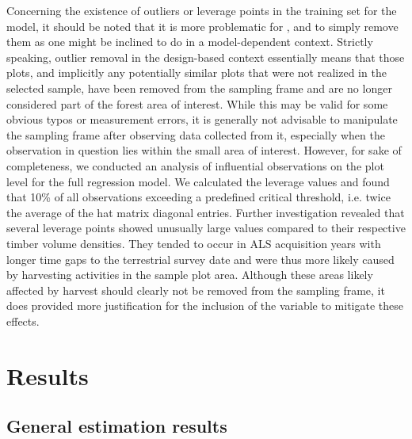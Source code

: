 



Concerning the existence of outliers or leverage points in the training set for the model, it should be noted that it is more problematic for \psmall{}, \psynth{} and \extpsynth{} to simply remove them as one might be inclined to do in a model-dependent context. Strictly speaking, outlier removal in the design-based context essentially means that those plots, and implicitly any potentially similar plots that were not realized in the selected sample, have been removed from the sampling frame and are no longer considered part of the forest area of interest. While this may be valid for some obvious typos or measurement errors, it is generally not advisable to manipulate the sampling frame after observing data collected from it, especially when the observation in question lies within the small area of interest. However, for sake of completeness, we conducted an analysis of influential observations \citep[pp. 160--167]{fahrmeir2013} on the plot level for the full regression model. We calculated the leverage values and found that 10\% of all observations exceeding a predefined critical threshold, i.e. twice the average of the hat matrix diagonal entries. Further investigation revealed that several leverage points showed unusually large \meanheight{} values compared to their respective timber volume densities. They tended to occur in ALS acquisition years with longer time gaps to the terrestrial survey date and were thus more likely caused by harvesting activities in the sample plot area.  Although these areas likely affected by harvest should clearly not be removed from the sampling frame, it does provided more justification for the inclusion of the \alsyear{} variable to mitigate these effects.



\section{Results}
\label{sec:Res}


\subsection{General estimation results}
\label{sec:feasest}

